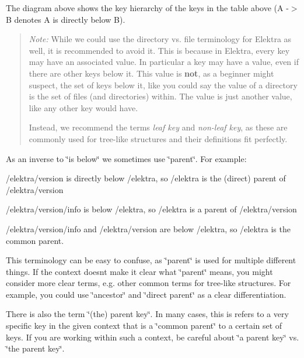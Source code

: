 The diagram above shows the key hierarchy of the keys in the table above ({\ttfamily A} -\/$>$ {\ttfamily B} denotes {\ttfamily A} is directly below {\ttfamily B}).

\begin{quote}
{\itshape Note\+:} While we could use the directory vs. file terminology for Elektra as well, it is recommended to avoid it. This is because in Elektra, every key may have an associated value. In particular a key may have a value, even if there are other keys below it. This value is {\bfseries not}, as a beginner might suspect, the set of keys below it, like you could say the value of a directory is the set of files (and directories) within. The value is just another value, like any other key would have.

Instead, we recommend the terms {\itshape leaf key} and {\itshape non-\/leaf key}, as these are commonly used for tree-\/like structures and their definitions fit perfectly. \end{quote}


As an inverse to \char`\"{}is below\char`\"{} we sometimes use \char`\"{}parent\char`\"{}. For example\+:


\begin{DoxyItemize}
\item {\ttfamily /elektra/version} is directly below {\ttfamily /elektra}, so {\ttfamily /elektra} is the (direct) parent of {\ttfamily /elektra/version}
\item {\ttfamily /elektra/version/info} is below {\ttfamily /elektra}, so {\ttfamily /elektra} is a parent of {\ttfamily /elektra/version}
\item {\ttfamily /elektra/version/info} and {\ttfamily /elektra/version} are below {\ttfamily /elektra}, so {\ttfamily /elektra} is the common parent.
\end{DoxyItemize}

This terminology can be easy to confuse, as \char`\"{}parent\char`\"{} is used for multiple different things. If the context doesn\textquotesingle{}t make it clear what \char`\"{}parent\char`\"{} means, you might consider more clear terms, e.\+g. other common terms for tree-\/like structures. For example, you could use \char`\"{}ancestor\char`\"{} and \char`\"{}direct parent\char`\"{} as a clear differentiation.

There is also the term \char`\"{}(the) parent key\char`\"{}. In many cases, this is refers to a very specific key in the given context that is a \char`\"{}common parent\char`\"{} to a certain set of keys. If you are working within such a context, be careful about \char`\"{}a parent key\char`\"{} vs. \char`\"{}the parent key\char`\"{}.

